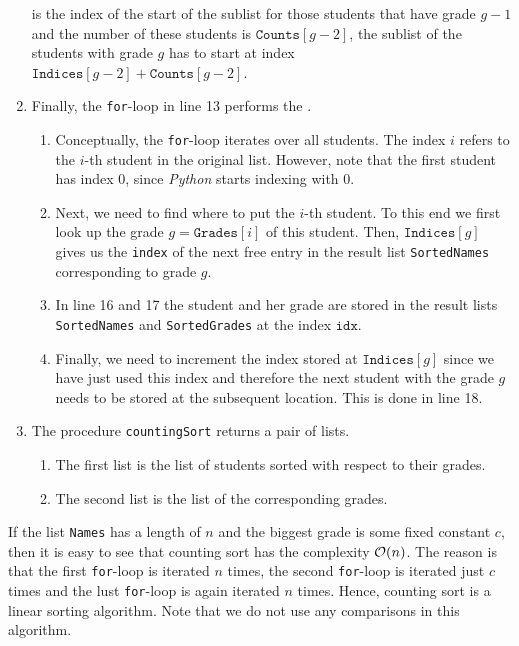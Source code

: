 \begin{enumerate}
      is the index of the start of the sublist for those students that have grade $g-1$ and the number of these
      students is $\texttt{Counts}[g-2]$, the sublist of the students with grade $g$ has to start at index
      \\[0.2cm]
      \hspace*{1.3cm}
      $\texttt{Indices}[g-2] + \texttt{Counts}[g-2]$.
\item Finally, the \texttt{for}-loop in line 13 performs the .
      \begin{enumerate}
      \item Conceptually, the \texttt{for}-loop iterates over all students. The index $i$ refers to the $i$-th
            student in the original list.  However, note that the first student has index $0$, since
            \textsl{Python} starts indexing with $0$.
      \item Next, we need to find where to put the $i$-th student.  To this end we first look up the
            grade $g = \texttt{Grades}[i]$ of this student.  Then, $\texttt{Indices}[g]$ gives us
            the \texttt{index} of the next free entry in the result list \texttt{SortedNames} corresponding to grade $g$.
      \item In line 16 and 17 the student and her grade are stored in the result lists \texttt{SortedNames}
            and \texttt{SortedGrades} at the index $\texttt{idx}$.
      \item Finally, we need to increment the index stored at $\texttt{Indices}[g]$ since we have just used
            this index and therefore the next student with the grade $g$ needs to be stored at the subsequent location.
            This is done in line 18.
      \end{enumerate}
\item The procedure \texttt{countingSort} returns a pair of lists.
      \begin{enumerate}
      \item The first list is the list of students sorted with respect to their grades.
      \item The second list is the list of the corresponding grades.
      \end{enumerate}
\end{enumerate}
If the list \texttt{Names} has a length of $n$ and the biggest grade is some fixed constant $c$, then it is easy to
see that counting sort has the complexity $\mathcal{O}(n)$.  The reason is that the first \texttt{for}-loop is iterated
$n$ times, the second \texttt{for}-loop is iterated just $c$ times and the lust \texttt{for}-loop is again
iterated $n$ times.  Hence, counting sort is a linear sorting algorithm.  Note that we do not use any
comparisons in this algorithm.

